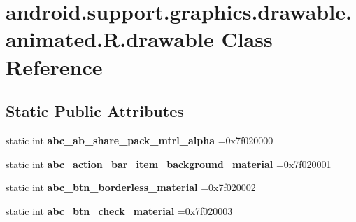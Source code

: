\hypertarget{classandroid_1_1support_1_1graphics_1_1drawable_1_1animated_1_1R_1_1drawable}{}\section{android.\+support.\+graphics.\+drawable.\+animated.\+R.\+drawable Class Reference}
\label{classandroid_1_1support_1_1graphics_1_1drawable_1_1animated_1_1R_1_1drawable}
\subsection*{Static Public Attributes}
\begin{DoxyCompactItemize}
\item 
\mbox{\label{classandroid_1_1support_1_1graphics_1_1drawable_1_1animated_1_1R_1_1drawable_a347d2f689c95633c78011f43cb874163}} 
static int {\bfseries abc\+\_\+ab\+\_\+share\+\_\+pack\+\_\+mtrl\+\_\+alpha} =0x7f020000
\item 
\mbox{\label{classandroid_1_1support_1_1graphics_1_1drawable_1_1animated_1_1R_1_1drawable_a7ab75c0810d4a2c4f92b8f8fca8557e8}} 
static int {\bfseries abc\+\_\+action\+\_\+bar\+\_\+item\+\_\+background\+\_\+material} =0x7f020001
\item 
\mbox{\label{classandroid_1_1support_1_1graphics_1_1drawable_1_1animated_1_1R_1_1drawable_a5fb4e066e3755fb40e7a54c0a3c3e809}} 
static int {\bfseries abc\+\_\+btn\+\_\+borderless\+\_\+material} =0x7f020002
\item 
\mbox{\label{classandroid_1_1support_1_1graphics_1_1drawable_1_1animated_1_1R_1_1drawable_a7af95eeb30439f1ba353a6f7ffacbc73}} 
static int {\bfseries abc\+\_\+btn\+\_\+check\+\_\+material} =0x7f020003
\item 
\mbox{\label{classandroid_1_1support_1_1graphics_1_1drawable_1_1animated_1_1R_1_1drawable_a9406e55eb75dc7dd44850d00cb472875}} 

\end{DoxyCompactItemize}
